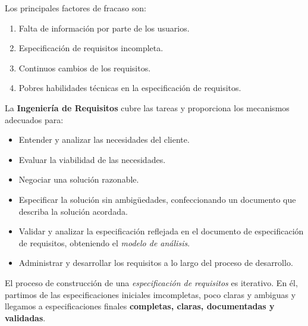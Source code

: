\documentclass[12pt,spanish]{article}
\begin{document}
Los principales factores de fracaso son:

\begin{enumerate}
	\item Falta de información por parte de los usuarios.
	\item Especificación de requisitos incompleta.
	\item Continuos cambios de los requisitos.
	\item Pobres habilidades técnicas en la especificación de requisitos.
\end{enumerate}

La \textbf{Ingeniería de Requisitos} cubre las tareas y proporciona los mecanismos adecuados para:
\begin{itemize}
	\item Entender y analizar las necesidades del cliente.
	\item Evaluar la viabilidad de las necesidades.
	\item Negociar una solución razonable.
	\item Especificar la solución sin ambigüedades, confeccionando un documento que describa la solución acordada.
	\item Validar y analizar la especificación reflejada en el documento de especificación de requisitos, obteniendo el \emph{modelo de análisis}.
	\item Administrar y desarrollar los requisitos a lo largo del proceso de desarrollo.
\end{itemize}

El proceso de construcción de una \emph{especificación de requisitos} es iterativo. En él, partimos de las especificaciones iniciales imcompletas, poco claras y ambiguas y llegamos a especificaciones finales \textbf{completas, claras, documentadas y validadas}.
\end{document}
